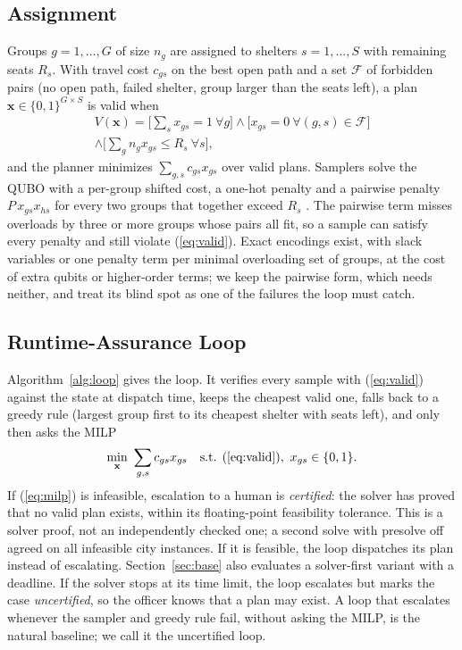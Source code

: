 \documentclass[conference]{IEEEtran}
\begin{document}
\subsection{Assignment}
Groups $g=1,\dots,G$ of size $n_g$ are assigned to shelters $s=1,\dots,S$ with remaining seats $R_s$. With travel cost $c_{gs}$ on the best open path and a set $\mathcal F$ of forbidden pairs (no open path, failed shelter, group larger than the seats left), a plan $\mathbf x\in\{0,1\}^{G\times S}$ is valid when
\begin{multline}
V(\mathbf x)=\Big[\textstyle\sum_s x_{gs}=1\ \forall g\Big]\wedge\Big[x_{gs}=0\ \forall (g,s)\in\mathcal F\Big]\\
\wedge\Big[\textstyle\sum_g n_g x_{gs}\le R_s\ \forall s\Big],
\label{eq:valid}
\end{multline}
and the planner minimizes $\sum_{g,s}c_{gs}x_{gs}$ over valid plans. Samplers solve the QUBO with a per-group shifted cost, a one-hot penalty and a pairwise penalty $P\,x_{gs}x_{hs}$ for every two groups that together exceed $R_s$ \cite{Glover2019}. The pairwise term misses overloads by three or more groups whose pairs all fit, so a sample can satisfy every penalty and still violate (\ref{eq:valid}). Exact encodings exist, with slack variables \cite{Glover2019} or one penalty term per minimal overloading set of groups, at the cost of extra qubits or higher-order terms; we keep the pairwise form, which needs neither, and treat its blind spot as one of the failures the loop must catch.

\subsection{Runtime-Assurance Loop}
Algorithm~\ref{alg:loop} gives the loop. It verifies every sample with (\ref{eq:valid}) against the state at dispatch time, keeps the cheapest valid one, falls back to a greedy rule (largest group first to its cheapest shelter with seats left), and only then asks the MILP
\begin{equation}
\min_{\mathbf x}\ \sum_{g,s}c_{gs}x_{gs}\quad\text{s.t. (\ref{eq:valid})},\ x_{gs}\in\{0,1\}.
\label{eq:milp}
\end{equation}
If (\ref{eq:milp}) is infeasible, escalation to a human is \emph{certified}: the solver has proved that no valid plan exists, within its floating-point feasibility tolerance. This is a solver proof, not an independently checked one; a second solve with presolve off agreed on all \RwRecheckSame{} infeasible city instances. If it is feasible, the loop dispatches its plan instead of escalating. Section~\ref{sec:base} also evaluates a solver-first variant with a deadline. If the solver stops at its time limit, the loop escalates but marks the case \emph{uncertified}, so the officer knows that a plan may exist. A loop that escalates whenever the sampler and greedy rule fail, without asking the MILP, is the natural baseline; we call it the uncertified loop.
\end{document}
